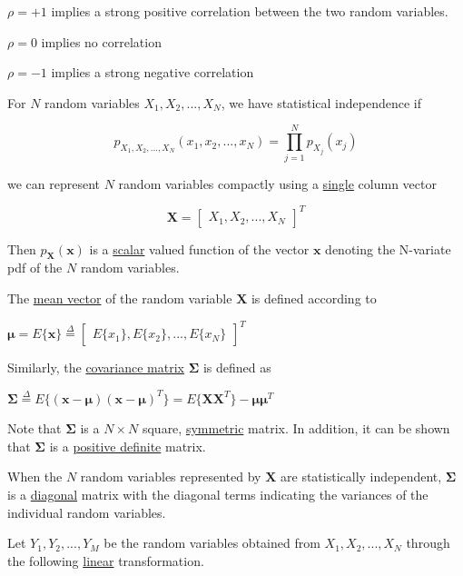 \documentclass[fleqn]{article}
\begin{document}
	$\rho = +1$ implies a strong positive correlation between the two random variables.
	
	$\rho = 0$ implies no correlation
	
	$\rho = -1$ implies a strong negative correlation	
	
	For $N$ random variables $X_1, X_2,...,X_N$, we have statistical independence if
	
	\begin{equation*}
		p_{X_1, X_2,...,X_N}(x_1,x_2,...,x_N) = \prod_{j=1}^{N}p_{X_j}(x_j)
	\end{equation*}
	
	we can represent $N$ random variables compactly using a \underline{single} column vector
	
	\begin{equation*}
		\mathbf{X} = \begin{bmatrix} X_1, X_2,... ,X_N\end{bmatrix}^T
	\end{equation*}
	
	Then $p_\mathbf{X}(\mathbf{x})$ is a \underline{scalar} valued function of the vector $\mathbf{x}$ denoting the N-variate pdf of the $N$ random variables.
	
	The \underline{mean vector} of the random variable $\mathbf{X}$ is defined according to
	
	$\boldsymbol{\mu} = E\{\mathbf{x}\} \overset{\Delta}{=} \begin{bmatrix}E\{x_1\},E\{x_2\},...,E\{x_N\}\end{bmatrix}^T$
	
	Similarly, the \underline{covariance matrix} $\mathbf{\Sigma}$ is defined as
	
	$\mathbf{\Sigma} \overset{\Delta}{=} E\{(\mathbf{x} - \boldsymbol{\mu})(\mathbf{x} - \boldsymbol{\mu})^T\} = E\{\mathbf{X}\mathbf{X}^T\} - \boldsymbol{\mu}\boldsymbol{\mu}^T$
	
	Note that $\mathbf{\Sigma}$ is a $N \times N$ square, \underline{symmetric} matrix. In addition, it can be shown that $\mathbf{\Sigma}$ is a \underline{positive definite} matrix.
	
	When the $N$ random variables represented by $\mathbf{X}$ are statistically independent, $\mathbf{\Sigma}$ is a \underline{diagonal} matrix with the diagonal terms indicating the variances of the individual random variables.
	
	Let $Y_1, Y_2,...,Y_M$ be the random variables obtained from $X_1,X_2,...,X_N$ through the following \underline{linear} transformation.
	
\end{document}
